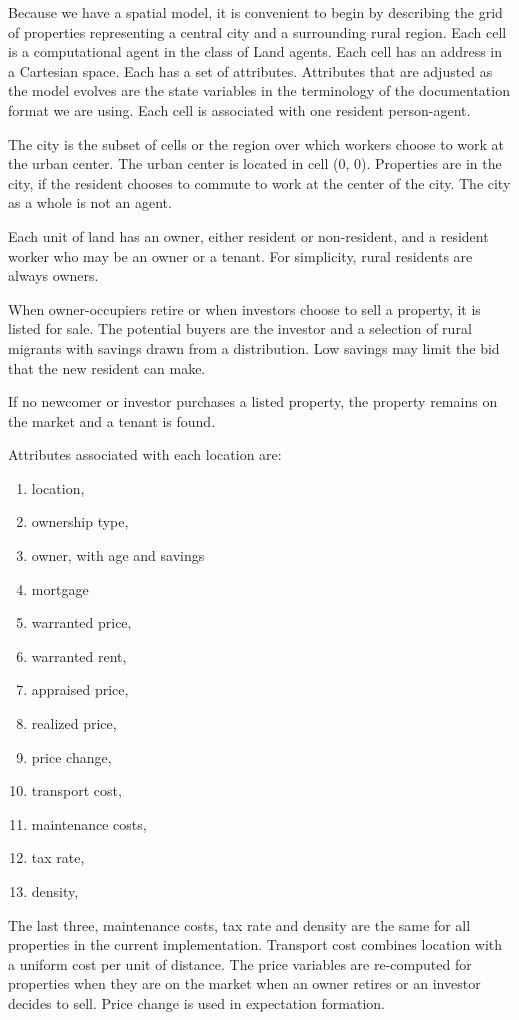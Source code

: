 Because we have a spatial model, it is convenient to begin by describing the grid of properties representing a central city and a surrounding rural region. Each cell is a computational agent in the class of Land agents. Each cell has an address in a Cartesian space. Each has a set of attributes. Attributes that are adjusted as the model evolves are the state variables in the terminology of the documentation format we are using. Each cell is associated with one resident person-agent. %

The city is the subset of cells or the region over which workers choose to work at the urban center. The urban center is located in cell (0, 0). Properties are in the city, if the resident chooses to commute to work at the center of the city.  The city as a whole is not an agent. 

Each unit of land has an owner, either resident or non-resident, and a resident worker who may be an owner or a tenant. For simplicity, rural residents are always owners.  

When owner-occupiers retire or when investors choose to sell a property, it is listed for sale. The potential buyers are the investor and a selection of rural migrants with savings drawn from a distribution.  Low savings may limit the bid that the new resident can make. 

If no newcomer or investor purchases a listed property, the property remains on the market and a tenant is found. 

Attributes associated with each location are:
\begin{enumerate}[topsep=8pt,itemsep=3pt,partopsep=4pt, parsep=4pt]%
    \item location,
    \item ownership type, 
    \item owner, with age and savings
    \item mortgage
    \item warranted price, 
    \item warranted rent, 
    \item appraised price, 
    \item realized price,
    \item price  change, 
    \item transport cost, 
    \item maintenance costs,
    \item tax rate,  
    \item density, 
\end{enumerate}
The last three,  maintenance costs, tax rate and density are the same for all properties in the current implementation. Transport cost combines location with a uniform cost per unit of distance.  The price variables are re-computed for properties when they are on the market when an owner retires or an investor decides to sell. Price change is used in expectation formation. %


